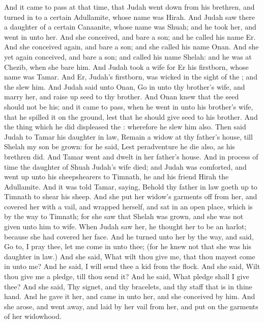 \begin{biblechapter} %
 And it came to pass at that time, that Judah went down from his brethren, and turned in to a certain Adullamite, whose name was Hirah.
\verse And Judah saw there a daughter of a certain Canaanite, whose name was Shuah; and he took her, and went in unto her.
\verse And she conceived, and bare a son; and he called his name Er.
\verse And she conceived again, and bare a son; and she called his name Onan.
\verse And she yet again conceived, and bare a son; and called his name Shelah: and he was at Chezib, when she bare him.
\verse And Judah took a wife for Er his firstborn, whose name was Tamar.
\verse And Er, Judah's firstborn, was wicked in the sight of the \LORD; and the \LORD slew him.
\verse And Judah said unto Onan, Go in unto thy brother's wife, and marry her, and raise up seed to thy brother.
\verse And Onan knew that the seed should not be his; and it came to pass, when he went in unto his brother's wife, that he spilled it on the ground, lest that he should give seed to his brother.
\verse And the thing which he did displeased the \LORD: wherefore he slew him also.
\verse Then said Judah to Tamar his daughter in law, Remain a widow at thy father's house, till Shelah my son be grown: for he said, Lest peradventure he die also, as his brethren did. And Tamar went and dwelt in her father's house.
\verse And in process of time the daughter of Shuah Judah's wife died; and Judah was comforted, and went up unto his sheepshearers to Timnath, he and his friend Hirah the Adullamite.
\verse And it was told Tamar, saying, Behold thy father in law goeth up to Timnath to shear his sheep.
\verse And she put her widow's garments off from her, and covered her with a vail, and wrapped herself, and sat in an open place, which is by the way to Timnath; for she saw that Shelah was grown, and she was not given unto him to wife.
\verse When Judah saw her, he thought her to be an harlot; because she had covered her face.
\verse And he turned unto her by the way, and said, Go to, I pray thee, let me come in unto thee; (for he knew not that she was his daughter in law.) And she said, What wilt thou give me, that thou mayest come in unto me?
\verse And he said, I will send thee a kid from the flock. And she said, Wilt thou give me a pledge, till thou send it?
\verse And he said, What pledge shall I give thee? And she said, Thy signet, and thy bracelets, and thy staff that is in thine hand. And he gave it her, and came in unto her, and she conceived by him.
\verse And she arose, and went away, and laid by her vail from her, and put on the garments of her widowhood.

\end{biblechapter}
